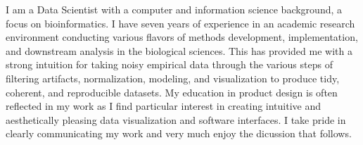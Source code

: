 \documentclass[letterpaper,9pt]{article}
\newcommand{\personalstatement}[1]{
  \begin{center}
  \begin{minipage}[t]{0.96\textwidth}
    \linespread{0.90}\selectfont
    \vspace{.1cm}\small{
      #1 \vspace{1pt}
    }
  \end{minipage}
  \end{center}
}
\begin{document}
\personalstatement{

I am a Data Scientist with a
computer and information science background,
a focus on bioinformatics.
I have seven years of experience in an academic research environment 
conducting various flavors of 
methods development, implementation, and downstream analysis
in the biological sciences.
This has provided me with a strong intuition
for taking noisy empirical data through the various steps 
of filtering artifacts, normalization,  modeling, and visualization
to produce tidy, coherent, and reproducible datasets.
My education in product design is often reflected in my work
as I find particular interest in creating intuitive and aesthetically
pleasing data visualization and software interfaces. 
I take pride in clearly communicating my work
and very much enjoy the dicussion that follows.




}
\end{document}
